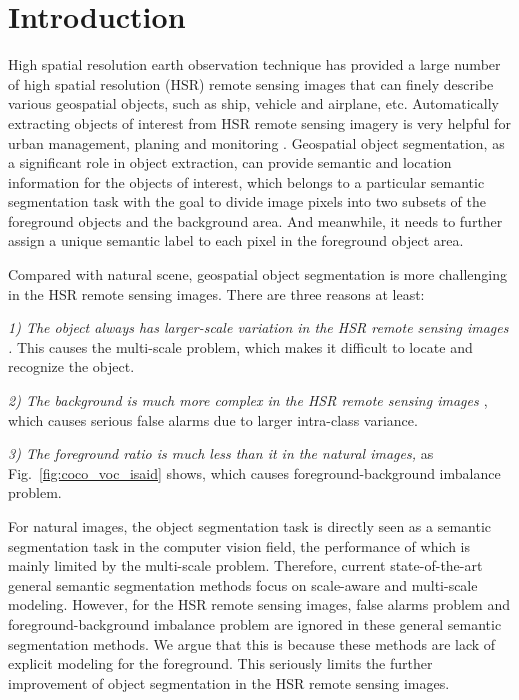 \documentclass[10pt,twocolumn,letterpaper]{article}
\begin{document}
\section{Introduction}
High spatial resolution earth observation technique has provided a large number of high spatial resolution (HSR) remote sensing images that can finely describe various geospatial objects, such as ship, vehicle and airplane, etc.
Automatically extracting objects of interest from HSR remote sensing imagery is very helpful for urban management, planing and monitoring \cite{rottensteiner2012isprs,volpi2015semantic,Kampffmeyer_2016_CVPR_Workshops,kemker2018algorithms}.
Geospatial object segmentation, as a significant role in object extraction, can provide semantic and location information for the objects of interest, which belongs to a particular semantic segmentation task with the goal to divide image pixels into two subsets of the foreground objects and the background area.
And meanwhile, it needs to further assign a unique semantic label to each pixel in the foreground object area.

Compared with natural scene, geospatial object segmentation is more challenging in the HSR remote sensing images.
There are three reasons at least:

\textit{1) The object always has larger-scale variation in the HSR remote sensing images \cite{deng2018multi, xia2018dota}.}
This causes the multi-scale problem, which makes it difficult to locate and recognize the object.

\textit{2) The background is much more complex in the HSR remote sensing images \cite{8672899, deng2019learning}}, which causes serious false alarms due to larger intra-class variance.

\textit{3) The foreground ratio is much less than it in the natural images,} as Fig.~\ref{fig:coco_voc_isaid} shows,
which causes foreground-background imbalance problem.

For natural images, the object segmentation task is directly seen as a semantic segmentation task in the computer vision field, the performance of which is mainly limited by the multi-scale problem.
Therefore, current state-of-the-art general semantic segmentation methods focus on scale-aware \cite{chen2016attention} and multi-scale \cite{chen2017deeplab,chen2017rethinking, chen2018encoder,yang2018denseaspp} modeling.
However, for the HSR remote sensing images, false alarms problem and foreground-background imbalance problem are ignored in these general semantic segmentation methods.
We argue that this is because these methods are lack of explicit modeling for the foreground.
This seriously limits the further improvement of object segmentation in the HSR remote sensing images.
\end{document}
